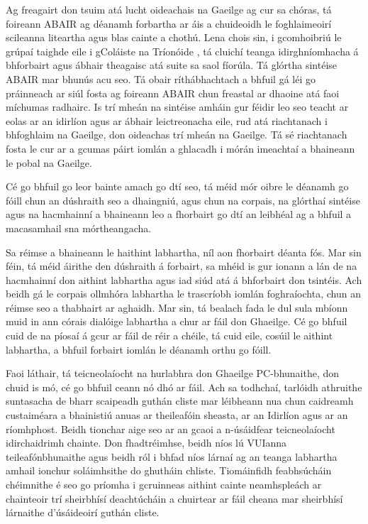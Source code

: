 \begin{multicols}{2}
Ag freagairt don tsuim atá lucht oideachais na Gaeilge ag cur sa chóras, tá foireann ABAIR ag déanamh forbartha ar áis a chuideoidh le foghlaimeoirí scileanna liteartha agus blas cainte a chothú. Lena chois sin, i gcomhoibriú le grúpaí taighde eile i gColáiste na Tríonóide \cite{slate2011}, tá cluichí teanga idirghníomhacha á bhforbairt agus ábhair theagaisc atá suite sa saol fíorúla. Tá glórtha sintéise ABAIR mar bhunús acu seo. Tá obair ríthábhachtach a bhfuil gá léi go práinneach ar siúl fosta ag foireann ABAIR chun freastal ar dhaoine atá faoi míchumas radhairc. Is trí mheán na sintéise amháin gur féidir leo seo teacht ar eolas ar an idirlíon agus ar ábhair leictreonacha eile, rud atá riachtanach i bhfoghlaim na Gaeilge, don oideachas trí mheán na Gaeilge. Tá sé riachtanach fosta le cur ar a gcumas páirt iomlán a ghlacadh i mórán imeachtaí a bhaineann le pobal na Gaeilge.

Cé go bhfuil go leor bainte amach go dtí seo, tá méid mór oibre le déanamh go fóill chun an dúshraith seo a dhaingniú, agus chun na corpais, na glórthaí sintéise agus na hacmhainní a bhaineann leo a fhorbairt go dtí an leibhéal ag a bhfuil a macasamhail sna mórtheangacha.     

Sa réimse a bhaineann le haithint labhartha, níl aon fhorbairt déanta fós. Mar sin féin, tá méid áirithe den dúshraith á forbairt, sa mhéid is gur ionann a lán de na hacmhainní don aithint labhartha agus iad siúd atá á bhforbairt don tsintéis. Ach beidh gá le corpais ollmhóra labhartha le trascríobh iomlán foghraíochta, chun an réimse seo a thabhairt ar aghaidh. Mar sin, tá bealach fada le dul sula mbíonn muid in ann córais dialóige labhartha a chur ar fáil don Ghaeilge. Cé go bhfuil cuid de na píosaí á gcur ar fáil de réir a chéile, tá cuid eile, cosúil le aithint labhartha, a bhfuil forbairt iomlán le déanamh orthu go fóill.

Faoi láthair, tá teicneolaíocht na hurlabhra don Ghaeilge PC-bhunaithe, don chuid is mó, cé go bhfuil ceann nó dhó ar fáil. Ach sa todhchaí, tarlóidh athruithe suntasacha de bharr scaipeadh guthán cliste mar léibheann nua chun caidreamh custaiméara a bhainistiú anuas ar theileafóin sheasta, ar an Idirlíon agus ar an ríomhphost. Beidh tionchar aige seo ar an gcaoi a n-úsáidfear teicneolaíocht idirchaidrimh chainte. Don fhadtréimhse, beidh níos lú VUIanna teileafónbhunaithe agus beidh ról i bhfad níos lárnaí ag an teanga labhartha amhail ionchur soláimhsithe do ghutháin chliste. Tiomáinfidh feabhsúcháin chéimnithe é seo go príomha i gcruinneas aithint cainte neamhspleách ar chainteoir trí sheirbhísí deachtúcháin a chuirtear ar fáil cheana mar sheirbhísí lárnaithe d’úsáideoirí guthán cliste.


\end{multicols}
